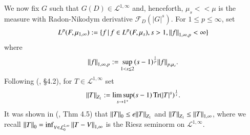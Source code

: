 \documentclass[final,1p]{elsarticle}
\numberwithin{equation}{section}
\theoremstyle{plain}
\theoremstyle{definition}
\begin{document}
\noindent We now fix $G$ such that $G(D) \in \mathcal{L}^{1,\infty}$
and, henceforth, $\mu_s {\ensuremath{\! < \! \! < \!}} \mu$ is the measure with Radon-Nikodym
derivative $\mathcal{F}_D(|G|^s)$.  For $1 \leq p \leq \infty$, set
\begin{equation} \label{eq:def1weak}
L^p(F,\mu_{1,\infty}) := {\ensuremath{\{ {f} \, | \, {f \in L^p(F,\mu_s), s > 1, {\mbox{\ensuremath{\| {f} \|}}}_{1,\infty,p} < \infty} \} }}
\end{equation}
where
$$
{\mbox{\ensuremath{\| {f} \|}}}_{1,\infty,p} := \sup_{1 < s \leq 2} (s-1)^{\frac{1}{p}} {\mbox{\ensuremath{\| {f} \|}}}_{p,\mu_s}.
$$
Following (\cite{CRSS}, \S 4.2), for $T \in \mathcal{L}^{1,\infty}$ set
\begin{equation} \label{eq:Z_1}
{\mbox{\ensuremath{\| {T} \|}}}_{Z_1} := \limsup_{s \to 1^+} (s-1)\operatorname{Tr}(|T|^s)^{\frac{1}{s}}.
\end{equation}
It was shown in (\cite{CRSS}, Thm 4.5) that ${\mbox{\ensuremath{\| {T} \|}}}_0 \leq
e{\mbox{\ensuremath{\| {T} \|}}}_{Z_1}$ and ${\mbox{\ensuremath{\| {T} \|}}}_{Z_1} \leq {\mbox{\ensuremath{\| {T} \|}}}_{1,\infty}$, where we
recall $\left\| T \right\|_0 = \inf_{V \in \mathcal{L}^{1,\infty}_0} {\mbox{\ensuremath{\| {T-V} \|}}}_{1,\infty}$ is the Riesz seminorm on $\mathcal{L}^{1,\infty}$.
\end{document}
